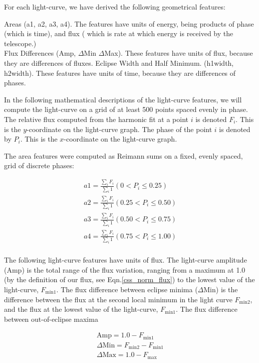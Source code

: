 \documentclass[12pt]{article} %
\numberwithin{equation}{section} %
\begin{document}
For each light-curve, we have derived the following geometrical features:

Areas (a1, a2, a3, a4). The features have units of energy, being products of phase (which is time), and flux ( which is rate at which energy is received by the telescope.) \\
Flux Differences (Amp, $\Delta$Min $\Delta$Max). These features have units of flux, because they are differences of fluxes.
Eclipse Width and Half Minimum. (h1width, h2width). These features have units of time, because they are differences of phases.

In the following mathematical descriptions of the light-curve features, we will compute the light-curve on a grid of at least 500 points spaced evenly in phase. The relative flux computed from the harmonic fit at a point $i$  is denoted $F_{i}$. This is the $y$-coordinate on the light-curve graph. The phase of the point $i$ is denoted by $P_{i}$. This is the $x$-coordinate on the light-curve graph.

The area features were computed as Reimann sums on a fixed, evenly spaced, grid of discrete phases:

\begin{multline} \label{area_features}
a1  = \frac{\sum_{i}F_{i}}{\sum_{i} 1} (0 < P_{i} \leq 0.25) \\
a2  = \frac{\sum_{i}F_{i}}{\sum_{i} 1}  (0.25 < P_{i} \leq 0.50) \\
a3  = \frac{\sum_{i}F_{i}}{\sum_{i} 1}  (0.50 < P_{i} \leq 0.75) \\
a4  = \frac{\sum_{i}F_{i}}{\sum_{i} 1}  (0.75 < P_{i} \leq 1.00) \\
\end{multline}

The following light-curve features have units of flux. The light-curve amplitude (Amp) is the total range of the flux variation, ranging from a maximum at 1.0 (by the definition of our flux, see Eqn.\ref{css_norm_flux}) to the lowest value of the light-curve, $F_{\text{min1}}$. The flux difference between eclipse minima ($\Delta$Min) is the difference between the flux at the second local minimum in the light curve $F_{\text{min2}}$, and the flux at the lowest value of the light-curve, $F_{\text{min1}}$. The flux difference between out-of-eclipse maxima 

\begin{multline} \label{flux_features}
\text{Amp} = 1.0 -  F_{\text{min1}} \\
\Delta \text{Min} =  F_{\text{min2}} - F_{\text{min1}} \\
\Delta \text{Max} = 1.0 - F_{\text{max}} \\
\end{multline}
\end{document}
